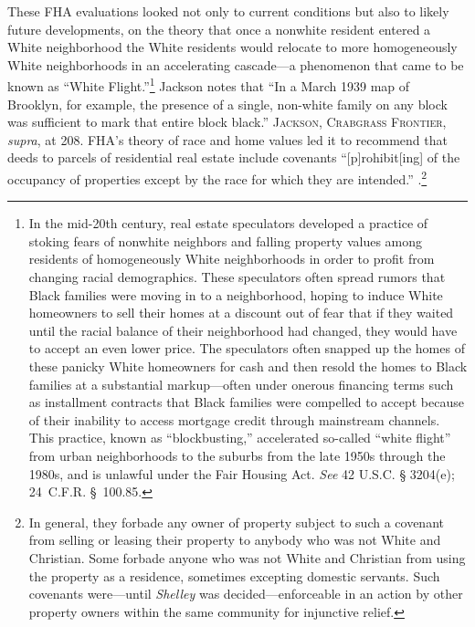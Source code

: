 These FHA evaluations looked not only to current conditions but also to likely
future developments, on the theory that once a nonwhite resident entered a
White neighborhood the White residents would relocate to more homogeneously
White neighborhoods in an accelerating cascade---a phenomenon that came to be
known as ``White Flight.''\footnote{In the mid-20th century,
real estate speculators developed a practice of stoking fears of nonwhite
neighbors and falling property values among residents of homogeneously White
neighborhoods in order to profit from changing racial demographics. These
speculators often spread rumors that Black families were moving in to a
neighborhood, hoping to induce White homeowners to sell their homes at a
discount out of fear that if they waited until the racial balance of their
neighborhood had changed, they would have to accept an even lower price. The
speculators often snapped up the homes of these panicky White homeowners for
cash and then resold the homes to Black families at a substantial
markup---often under onerous financing terms such as installment contracts that
Black families were compelled to accept because of their inability to access
mortgage credit through mainstream channels. This practice, known as
``blockbusting,'' accelerated so-called ``white flight'' from urban
neighborhoods to the suburbs from the late 1950s through the 1980s, and is
unlawful under the Fair Housing Act. \textit{See} 42 U.S.C. {\S} 3204(e);
24~C.F.R. \S~100.85.} Jackson notes that ``In a March 1939 map of Brooklyn,
for example, the presence of a single, non-white family on any block was
sufficient to mark that entire block black.'' \textsc{Jackson, Crabgrass
Frontier}, \textit{supra}, at 208. FHA's theory of race and home
values led it to recommend that deeds to parcels of residential real estate
include covenants ``[p]rohibit[ing] of the occupancy of properties except by
the race for which they are intended.''
.\footnote{
In general, they forbade any owner of property subject
to such a covenant from selling or leasing their property to anybody who was
not White and Christian. Some forbade anyone who was not White and Christian
from using the property as a residence, sometimes excepting domestic servants.
Such covenants were---until \textit{Shelley} was decided---enforceable in an
action by other property owners within the same community for injunctive
relief.}

